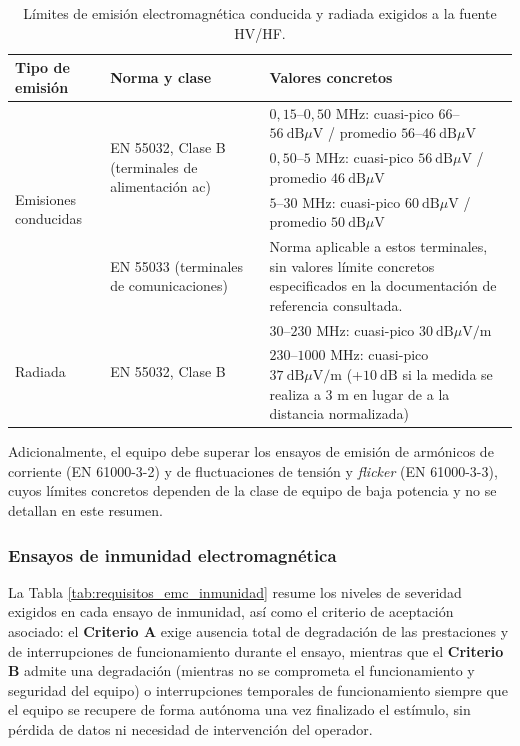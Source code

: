\begin{table}[!h]
\centering
\small
\begin{tabular}{|p{2.0cm}|p{3.6cm}|p{8.2cm}|}
\hline
\textbf{Tipo de emisión} & \textbf{Norma y clase} & \textbf{Valores concretos} \\ \hline
\multirow{4}{2.0cm}{Emisiones conducidas} & \multirow{3}{3.6cm}{EN 55032, Clase B (terminales de alimentación \gls{ac})} & $0,15$--$0,50$ MHz: cuasi-pico $66$--$56\ \text{dB}\mu\text{V}$ / promedio $56$--$46\ \text{dB}\mu\text{V}$ \\
 & & $0,50$--$5$ MHz: cuasi-pico $56\ \text{dB}\mu\text{V}$ / promedio $46\ \text{dB}\mu\text{V}$ \\
 & & $5$--$30$ MHz: cuasi-pico $60\ \text{dB}\mu\text{V}$ / promedio $50\ \text{dB}\mu\text{V}$ \\ \cline{2-3}
 & EN 55033 (terminales de comunicaciones) & Norma aplicable a estos terminales, sin valores límite concretos especificados en la documentación de referencia consultada. \\ \hline
\multirow{2}{2.0cm}{Radiada} & \multirow{2}{3.6cm}{EN 55032, Clase B} & $30$--$230$ MHz: cuasi-pico $30\ \text{dB}\mu\text{V/m}$ \\
 & & $230$--$1000$ MHz: cuasi-pico $37\ \text{dB}\mu\text{V/m}$ (+$10\ \text{dB}$ si la medida se realiza a 3 m en lugar de a la distancia normalizada) \\ \hline
\end{tabular}
\caption{Límites de emisión electromagnética conducida y radiada exigidos a la fuente HV/HF.}
\label{tab:requisitos_emc_emisiones}
\end{table}

Adicionalmente, el equipo debe superar los ensayos de emisión de armónicos de corriente (EN 61000-3-2) y de fluctuaciones de tensión y \textit{flicker} (EN 61000-3-3), cuyos límites concretos dependen de la clase de equipo de baja potencia y no se detallan en este resumen.

\subsubsection*{Ensayos de inmunidad electromagnética}

La Tabla \ref{tab:requisitos_emc_inmunidad} resume los niveles de severidad exigidos en cada ensayo de inmunidad, así como el criterio de aceptación asociado: el \textbf{Criterio A} exige ausencia total de degradación de las prestaciones y de interrupciones de funcionamiento durante el ensayo, mientras que el \textbf{Criterio B} admite una degradación (mientras no se comprometa el funcionamiento y seguridad del equipo) o interrupciones temporales de funcionamiento siempre que el equipo se recupere de forma autónoma una vez finalizado el estímulo, sin pérdida de datos ni necesidad de intervención del operador.

